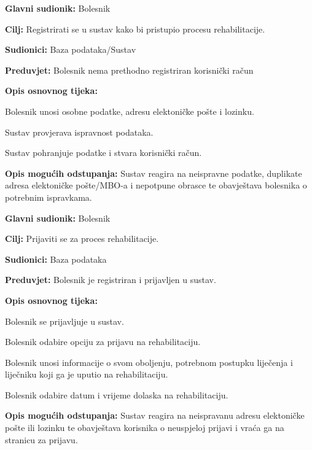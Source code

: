 \noindent {}
\begin{packed_item}
	\item \textbf{Glavni sudionik:} Bolesnik
	\item \textbf{Cilj:} Registrirati se u sustav kako bi pristupio procesu rehabilitacije.
	\item \textbf{Sudionici:} Baza podataka/Sustav
	\item \textbf{Preduvjet:} Bolesnik nema prethodno registriran korisnički račun
	\item \textbf{Opis osnovnog tijeka:}
	\begin{packed_enum}
		\item Bolesnik unosi osobne podatke, adresu elektoničke pošte i lozinku.
		\item Sustav provjerava ispravnost podataka.
		\item Sustav pohranjuje podatke i stvara korisnički račun.
	\end{packed_enum}
	\item \textbf{Opis mogućih odstupanja:}
	Sustav reagira na neispravne podatke, duplikate adresa elektoničke pošte/MBO-a i nepotpune
	obrasce te obavještava bolesnika o potrebnim ispravkama.
\end{packed_item}
\vspace{1em} %

\noindent{}
\begin{packed_item}
	\item \textbf{Glavni sudionik:} Bolesnik
	\item \textbf{Cilj:} Prijaviti se za proces rehabilitacije.
	\item \textbf{Sudionici:} Baza podataka
	\item \textbf{Preduvjet:} Bolesnik je registriran i prijavljen u sustav.
	\item \textbf{Opis osnovnog tijeka:}
	\begin{packed_enum}
		\item Bolesnik se prijavljuje u sustav.
		\item Bolesnik odabire opciju za prijavu na rehabilitaciju.
		\item Bolesnik unosi informacije o svom oboljenju, potrebnom postupku liječenja i liječniku koji ga je uputio na rehabilitaciju.
		\item Bolesnik odabire datum i vrijeme dolaska na rehabilitaciju.
	\end{packed_enum}
	\item \textbf{Opis mogućih odstupanja:}
	Sustav reagira na neispravanu adresu elektoničke pošte ili lozinku te obavještava korisnika o neuspjeloj prijavi i vraća ga na stranicu za prijavu.
\end{packed_item}
\vspace{1em} %

